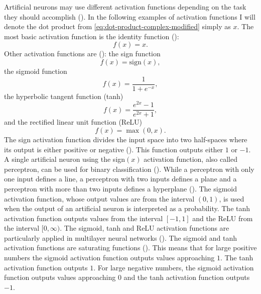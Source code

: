 \documentclass{BachelorBUI}
\begin{document}
                Artificial neurons may use different activation functions depending on the task they should accomplish (\cite{Aggarwal:2018}). In the following examples of activation functions I will denote the dot product from \autoref{eq:dot-product-complex-modified} simply as $x$. The most basic activation function is the identity function (\cite{Aggarwal:2018}):
                \begin{equation}
                    f(x)=x.
                    \label{eq:identity-function}
                \end{equation}
                Other activation functions are (\cite{Aggarwal:2018}): the sign function
                \begin{equation}
                    f(x)=\text{sign}(x),
                    \label{eq:sign-function}
                \end{equation}
                the sigmoid function
                \begin{equation}
                    f(x) = \frac{1}{1 + e^{-x}},
                    \label{eq:sigmoid-function}
                \end{equation}
                the hyperbolic tangent function (tanh)
                \begin{equation}
                     f(x) = \frac{e^{2x}-1}{e^{2x}+1},
                    \label{eq:tanh-function}
                \end{equation}
                and the rectified linear unit function (ReLU)
                \begin{equation}
                    f(x) = \max(0, x).
                    \label{eq:relu-function}
                \end{equation}
                The sign activation function divides the input space into two half-spaces where its output is either positive or negative (\cite{Alpaydin:2014}). This function outputs either $1$ or $-1$. A single artificial neuron using the sign$(x)$ activation function, also called perceptron, can be used for binary classification (\cite{Aggarwal:2018}). While a perceptron with only one input defines a line, a perceptron with two inputs defines a plane and a perceptron with more than two inputs defines a hyperplane (\cite{Alpaydin:2014}). The sigmoid activation function, whose output values are from the interval $(0,1)$, is used when the output of an artificial neuron is interpreted as a probability. The tanh activation function outputs values from the interval $[-1,1]$ and the ReLU from the interval $[0, \infty)$. The sigmoid, tanh and ReLU activation functions are particularly applied in multilayer neural networks (\cite{Alpaydin:2014}). The sigmoid and tanh activation functions are saturating functions (\cite{Murphy:2022}). This means that for large positive numbers the sigmoid activation function outputs values approaching $1$. The tanh activation function outputs $1$. For large negative numbers, the sigmoid activation function outputs values approaching $0$ and the tanh activation function outputs $-1$. 
\end{document}
